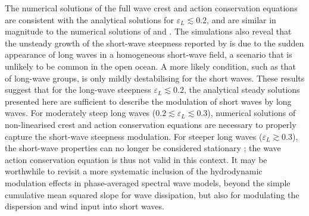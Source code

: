 \documentclass[lineno]{jfm}
\begin{document}
The numerical solutions of the full wave crest and action conservation equations
are consistent with the analytical solutions for $\varepsilon_L \lesssim 0.2$,
and are similar in magnitude to the numerical solutions of
\citet{longuet1987propagation} and \citet{zhang1990evolution}.
The simulations also reveal that the unsteady growth of the short-wave steepness
reported by \citet{peureux2021unsteady} is due to the sudden appearance of
long waves in a homogeneous short-wave field, a scenario that is unlikely to
be common in the open ocean.
A more likely condition, such as that of long-wave groups, is only mildly
destabilising for the short waves.
These results suggest that for the long-wave steepness $\varepsilon_L \lesssim 0.2$,
the analytical steady solutions presented here are sufficient to describe the
modulation of short waves by long waves.
For moderately steep long waves ($0.2 \lesssim \varepsilon_L \lesssim 0.3$),
numerical solutions of non-linearised crest and action conservation equations
are necessary to properly capture the short-wave steepness modulation.
For steeper long waves ($\varepsilon_L \gtrsim 0.3$), the short-wave properties can
no longer be considered stationary \citep{bretherton1968wavetrains};
the wave action conservation equation is thus not valid in this context.
It may be worthwhile to revisit a more systematic inclusion of the hydrodynamic
modulation effects in phase-averaged spectral wave models, beyond the simple
cumulative mean squared slope for wave dissipation, but also for modulating
the dispersion and wind input into short waves.




\end{document}
